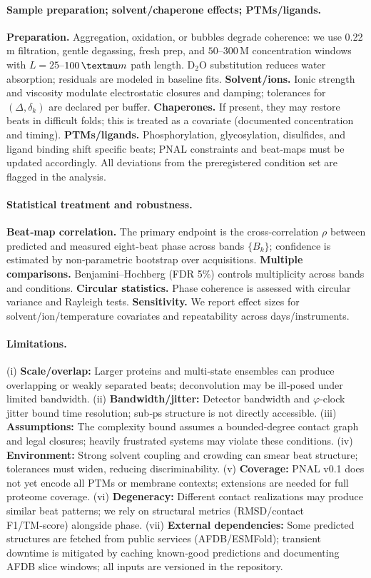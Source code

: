 \documentclass[12pt,a4paper]{article}
\begin{document}
\paragraph{Sample preparation; solvent/chaperone effects; PTMs/ligands.}
\textbf{Preparation.} Aggregation, oxidation, or bubbles degrade coherence: we use 0.22\,\textmu m filtration, gentle degassing, fresh prep, and $50$–$300$\,\textmu M concentration windows with $L=25$–$100\,\textmu m$ path length. D$_2$O substitution reduces water absorption; residuals are modeled in baseline fits. \textbf{Solvent/ions.} Ionic strength and viscosity modulate electrostatic closures and damping; tolerances for $(\Delta,\delta_k)$ are declared per buffer. \textbf{Chaperones.} If present, they may restore beats in difficult folds; this is treated as a covariate (documented concentration and timing). \textbf{PTMs/ligands.} Phosphorylation, glycosylation, disulfides, and ligand binding shift specific beats; PNAL constraints and beat‑maps must be updated accordingly. All deviations from the preregistered condition set are flagged in the analysis.

\paragraph{Statistical treatment and robustness.}
\textbf{Beat‑map correlation.} The primary endpoint is the cross‑correlation $\rho$ between predicted and measured eight‑beat phase across bands $\{B_k\}$; confidence is estimated by non‑parametric bootstrap over acquisitions. \textbf{Multiple comparisons.} Benjamini–Hochberg (FDR 5\%) controls multiplicity across bands and conditions. \textbf{Circular statistics.} Phase coherence is assessed with circular variance and Rayleigh tests. \textbf{Sensitivity.} We report effect sizes for solvent/ion/temperature covariates and repeatability across days/instruments.

\paragraph{Limitations.}
(i) \textbf{Scale/overlap:} Larger proteins and multi‑state ensembles can produce overlapping or weakly separated beats; deconvolution may be ill‑posed under limited bandwidth. (ii) \textbf{Bandwidth/jitter:} Detector bandwidth and $\varphi$‑clock jitter bound time resolution; sub‑ps structure is not directly accessible. (iii) \textbf{Assumptions:} The complexity bound assumes a bounded‑degree contact graph and legal closures; heavily frustrated systems may violate these conditions. (iv) \textbf{Environment:} Strong solvent coupling and crowding can smear beat structure; tolerances must widen, reducing discriminability. (v) \textbf{Coverage:} PNAL v0.1 does not yet encode all PTMs or membrane contexts; extensions are needed for full proteome coverage. (vi) \textbf{Degeneracy:} Different contact realizations may produce similar beat patterns; we rely on structural metrics (RMSD/contact F1/TM‑score) alongside phase. (vii) \textbf{External dependencies:} Some predicted structures are fetched from public services (AFDB/ESMFold); transient downtime is mitigated by caching known‑good predictions and documenting AFDB slice windows; all inputs are versioned in the repository.
\end{document}

